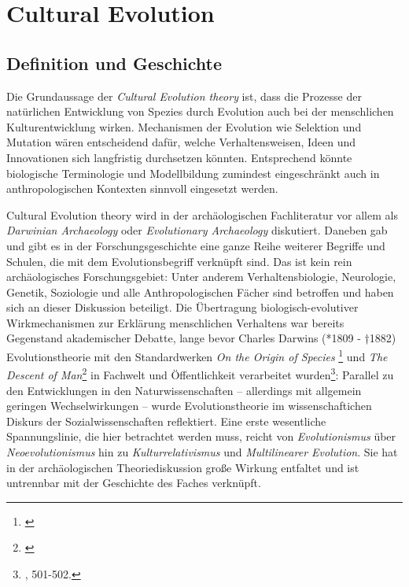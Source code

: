 \documentclass[openany,twoside,twocolumn]{book}
\let\rmarkdownfootnote\footnote%
\def\footnote{\protect\rmarkdownfootnote}
\begin{document}
\hypertarget{cultural-evolution}{%
\chapter{Cultural Evolution}\label{cultural-evolution}}

\hypertarget{definition-und-geschichte}{%
\section{Definition und Geschichte}\label{definition-und-geschichte}}

Die Grundaussage der \emph{Cultural Evolution theory} ist, dass die
Prozesse der natürlichen Entwicklung von Spezies durch Evolution auch
bei der menschlichen Kulturentwicklung wirken. Mechanismen der Evolution
wie Selektion und Mutation wären entscheidend dafür, welche
Verhaltensweisen, Ideen und Innovationen sich langfristig durchsetzen
könnten. Entsprechend könnte biologische Terminologie und Modellbildung
zumindest eingeschränkt auch in anthropologischen Kontexten sinnvoll
eingesetzt werden.

Cultural Evolution theory wird in der archäologischen Fachliteratur vor
allem als \emph{Darwinian Archaeology} oder \emph{Evolutionary
Archaeology} diskutiert. Daneben gab und gibt es in der
Forschungsgeschichte eine ganze Reihe weiterer Begriffe und Schulen, die
mit dem Evolutionsbegriff verknüpft sind. Das ist kein rein
archäologisches Forschungsgebiet: Unter anderem Verhaltensbiologie,
Neurologie, Genetik, Soziologie und alle Anthropologischen Fächer sind
betroffen und haben sich an dieser Diskussion beteiligt. Die Übertragung
biologisch-evolutiver Wirkmechanismen zur Erklärung menschlichen
Verhaltens war bereits Gegenstand akademischer Debatte, lange bevor
Charles Darwins (*1809 - †1882) Evolutionstheorie mit den Standardwerken
\emph{On the Origin of Species} \footnote{\textcite{Darwinoriginspeciesmeans1859}}
und \emph{The Descent of Man}\footnote{\textcite{Darwindescentmanselection1871}}
in Fachwelt und Öffentlichkeit verarbeitet wurden\footnote{\textcite{petermann_geschichte_2004},
  501-502.}: Parallel zu den Entwicklungen in den Naturwissenschaften --
allerdings mit allgemein geringen Wechselwirkungen -- wurde
Evolutionstheorie im wissenschaftichen Diskurs der Sozialwissenschaften
reflektiert. Eine erste wesentliche Spannungslinie, die hier betrachtet
werden muss, reicht von \emph{Evolutionismus} über
\emph{Neoevolutionismus} hin zu \emph{Kulturrelativismus} und
\emph{Multilinearer Evolution}. Sie hat in der archäologischen
Theoriediskussion große Wirkung entfaltet und ist untrennbar mit der
Geschichte des Faches verknüpft.
\end{document}
